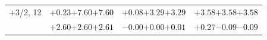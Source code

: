 \documentclass[compress]{beamer}
\begin{document}
\begin{frame}
\begin{tabular}{r | c | c | c}
$+$3/2, 12 & $+0.23$\hspace{0.1 cm}$+7.60$\hspace{0.1 cm}\textcolor{black}{$+7.60$} & $+0.08$\hspace{0.1 cm}$+3.29$\hspace{0.1 cm}\textcolor{black}{$+3.29$} & $+3.58$\hspace{0.1 cm}$+3.58$\hspace{0.1 cm}\textcolor{black}{$+3.58$} \\
           & $+2.60$\hspace{0.1 cm}$+2.60$\hspace{0.1 cm}\textcolor{black}{$+2.61$} & $-0.00$\hspace{0.1 cm}$+0.00$\hspace{0.1 cm}\textcolor{black}{$+0.01$} & $+0.27$\hspace{0.1 cm}$-0.09$\hspace{0.1 cm}\textcolor{black}{$-0.09$} \\
\end{tabular}
\end{frame}
\end{document}
